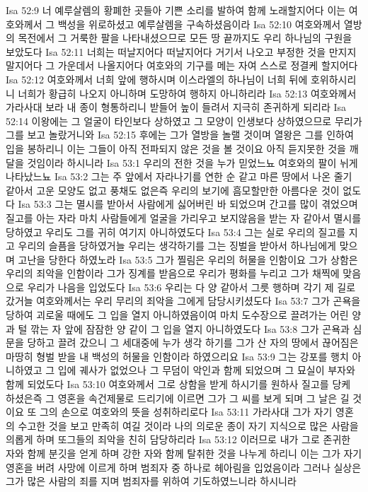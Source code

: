 Isa 52:9  너 예루살렘의 황폐한 곳들아 기쁜 소리를 발하여 함께 노래할지어다 이는 여호와께서 그 백성을 위로하셨고 예루살렘을 구속하셨음이라
Isa 52:10  여호와께서 열방의 목전에서 그 거룩한 팔을 나타내셨으므로 모든 땅 끝까지도 우리 하나님의 구원을 보았도다
Isa 52:11  너희는 떠날지어다 떠날지어다 거기서 나오고 부정한 것을 만지지 말지어다 그 가운데서 나올지어다 여호와의 기구를 메는 자여 스스로 정결케 할지어다
Isa 52:12  여호와께서 너희 앞에 행하시며 이스라엘의 하나님이 너희 뒤에 호위하시리니 너희가 황급히 나오지 아니하며 도망하여 행하지 아니하리라
Isa 52:13  여호와께서 가라사대 보라 내 종이 형통하리니 받들어 높이 들려서 지극히 존귀하게 되리라
Isa 52:14  이왕에는 그 얼굴이 타인보다 상하였고 그 모양이 인생보다 상하였으므로 무리가 그를 보고 놀랐거니와
Isa 52:15  후에는 그가 열방을 놀랠 것이며 열왕은 그를 인하여 입을 봉하리니 이는 그들이 아직 전파되지 않은 것을 볼 것이요 아직 듣지못한 것을 깨달을 것임이라 하시니라
Isa 53:1  우리의 전한 것을 누가 믿었느뇨 여호와의 팔이 뉘게 나타났느뇨
Isa 53:2  그는 주 앞에서 자라나기를 연한 순 같고 마른 땅에서 나온 줄기 같아서 고운 모양도 없고 풍채도 없은즉 우리의 보기에 흠모할만한 아름다운 것이 없도다
Isa 53:3  그는 멸시를 받아서 사람에게 싫어버린 바 되었으며 간고를 많이 겪었으며 질고를 아는 자라 마치 사람들에게 얼굴을 가리우고 보지않음을 받는 자 같아서 멸시를 당하였고 우리도 그를 귀히 여기지 아니하였도다
Isa 53:4  그는 실로 우리의 질고를 지고 우리의 슬픔을 당하였거늘 우리는 생각하기를 그는 징벌을 받아서 하나님에게 맞으며 고난을 당한다 하였노라
Isa 53:5  그가 찔림은 우리의 허물을 인함이요 그가 상함은 우리의 죄악을 인함이라 그가 징계를 받음으로 우리가 평화를 누리고 그가 채찍에 맞음으로 우리가 나음을 입었도다
Isa 53:6  우리는 다 양 같아서 그릇 행하며 각기 제 길로 갔거늘 여호와께서는 우리 무리의 죄악을 그에게 담당시키셨도다
Isa 53:7  그가 곤욕을 당하여 괴로울 때에도 그 입을 열지 아니하였음이여 마치 도수장으로 끌려가는 어린 양과 털 깎는 자 앞에 잠잠한 양 같이 그 입을 열지 아니하였도다
Isa 53:8  그가 곤욕과 심문을 당하고 끌려 갔으니 그 세대중에 누가 생각 하기를 그가 산 자의 땅에서 끊어짐은 마땅히 형벌 받을 내 백성의 허물을 인함이라 하였으리요
Isa 53:9  그는 강포를 행치 아니하였고 그 입에 궤사가 없었으나 그 무덤이 악인과 함께 되었으며 그 묘실이 부자와 함께 되었도다
Isa 53:10  여호와께서 그로 상함을 받게 하시기를 원하사 질고를 당케 하셨은즉 그 영혼을 속건제물로 드리기에 이르면 그가 그 씨를 보게 되며 그 날은 길 것이요 또 그의 손으로 여호와의 뜻을 성취하리로다
Isa 53:11  가라사대 그가 자기 영혼의 수고한 것을 보고 만족히 여길 것이라 나의 의로운 종이 자기 지식으로 많은 사람을 의롭게 하며 또그들의 죄악을 친히 담당하리라
Isa 53:12  이러므로 내가 그로 존귀한 자와 함께 분깃을 얻게 하며 강한 자와 함께 탈취한 것을 나누게 하리니 이는 그가 자기 영혼을 버려 사망에 이르게 하며 범죄자 중 하나로 헤아림을 입었음이라 그러나 실상은 그가 많은 사람의 죄를 지며 범죄자를 위하여 기도하였느니라 하시니라
